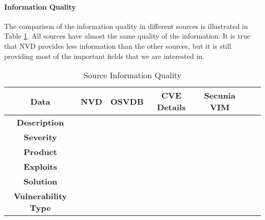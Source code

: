 \paragraph{Information Quality}
The comparison of the information quality in different sources is illustrated in Table \ref{table:info_quality}. All sources have almost the same quality of the information. It is true that NVD provides less information than the other sources, but it is still providing most of the important fields that we are interested in. 



\begin{table}
\begin{center}
    \begin{tabular}{ | c || c | c | c | c | c | c |}
    
    \hline
	 
      Data & \textbf{NVD}  &  \textbf{OSVDB} & \textbf{CVE Details} & \textbf{Secunia VIM} 
	\\ 
	\hline  
	\textbf{Description} & \multicolumn{1}{c|}{\cellcolor{green!25}\cmark} & \multicolumn{1}{c|}{\cellcolor{green!25}\cmark}
	& \multicolumn{1}{c|}{\cellcolor{green!25}\cmark}& \multicolumn{1}{c|}{\cellcolor{green!25}\cmark}
    \\ 
	\hline   
	 \textbf{Severity} & \multicolumn{1}{c|}{\cellcolor{green!25}\cmark} & \multicolumn{1}{c|}{\cellcolor{green!25}\cmark}
	& \multicolumn{1}{c|}{\cellcolor{green!25}\cmark}& \multicolumn{1}{c|}{\cellcolor{green!25}\cmark}
	  \\ 
	\hline
	 \textbf{Product} & \multicolumn{1}{c|}{\cellcolor{green!25}\cmark} & \multicolumn{1}{c|}{\cellcolor{green!25}\cmark}
	& \multicolumn{1}{c|}{\cellcolor{green!25}\cmark}& \multicolumn{1}{c|}{\cellcolor{green!25}\cmark}
	  \\ 
	\hline
	 \textbf{Exploits} & \multicolumn{1}{c|}{\cellcolor{red!25}\xmark} & \multicolumn{1}{c|}{\cellcolor{red!25}\xmark}
	& \multicolumn{1}{c|}{\cellcolor{green!25}\cmark}& \multicolumn{1}{c|}{\cellcolor{red!25}\xmark}
	  \\ 
	\hline 
	 \textbf{Solution} & \multicolumn{1}{c|}{\cellcolor{red!25}\xmark} & \multicolumn{1}{c|}{\cellcolor{green!25}\cmark}
	& \multicolumn{1}{c|}{\cellcolor{red!25}\xmark}& \multicolumn{1}{c|}{\cellcolor{green!25}\cmark}
	  \\ 
	\hline 
	 \textbf{Vulnerability Type} & \multicolumn{1}{c|}{\cellcolor{green!25}\cmark} & \multicolumn{1}{c|}{\cellcolor{green!25}\cmark}
	& \multicolumn{1}{c|}{\cellcolor{green!25}\cmark}& \multicolumn{1}{c|}{\cellcolor{green!25}\cmark}
	 \\
	 \hline	 

     
\end{tabular}
    \caption{Source Information Quality}
    \label{table:info_quality}
   \end{center}
    \end{table}
    
